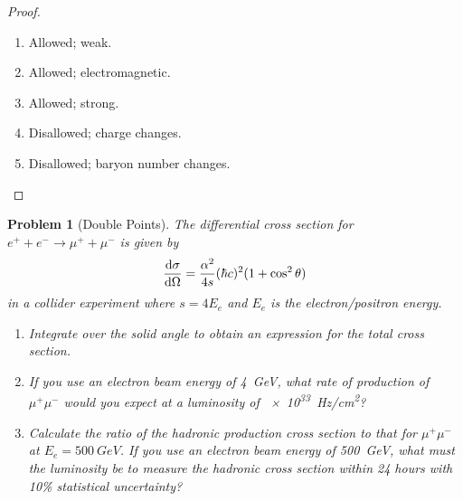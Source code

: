 \documentclass{article}
\newtheorem{plm}{Problem}
\begin{document}
\begin{proof} \;
  \begin{enumerate}
  \item Allowed; weak.
  \item Allowed; electromagnetic.
  \item Allowed; strong.
  \item Disallowed; charge changes.
  \item Disallowed; baryon number changes.
  \end{enumerate}
\end{proof}

\begin{plm}[Double Points]
  The differential cross section for $e^{+} + e^{-} \to \mu^{+} + \mu^{-}$ is given by
  \[
    \dv{\sigma}{\Omega} = \frac{\alpha^{2}}{4s}(\hbar c)^{2}(1 + \cos^{2}\theta)
  \]
  in a collider experiment where $s = 4E_{e}$ and $E_{e}$ is the electron/positron energy.
  \begin{enumerate}
  \item Integrate over the solid angle to obtain an expression for the total cross section.
  \item If you use an electron beam energy of \SI{4}{GeV}, what rate of production of $\mu^{+}\mu^{-}$ would you expect at a luminosity of
    \SI{e33}{Hz/cm^{2}}?
  \item Calculate the ratio of the hadronic production cross section to that for $\mu^{+}\mu^{-}$ at $E_{e} = \SI{500}{GeV}$.
    If you use an electron beam energy of \SI{500}{GeV}, what must the luminosity be to measure the hadronic cross section within 24 hours
    with 10\% statistical uncertainty?
  \end{enumerate}
\end{plm}
\end{document}
